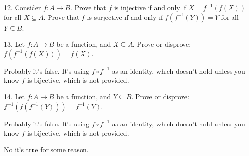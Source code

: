 \documentclass{article}
\begin{document}
\begin{exercise}{}{}
	{12. Consider $f: A \rightarrow B$. Prove that $f$ is injective if and only
		if $X=f^{-1}(f(X))$ for all $X \subseteq A$. Prove that $f$ is surjective if
		and only if $f\left(f^{-1}(Y)\right)=Y$ for all $Y \subseteq B$.}
\end{exercise}{}{}

\begin{exercise}{}{}
	{13. Let $f: A \rightarrow B$ be a function, and $X \subseteq A$. Prove or
		disprove: $f\left(f^{-1}(f(X))\right)=f(X)$.}
	\begin{alist}
		\item Probably it's false. It's using $f\circ f^{-1}$ as an identity, which
		doesn't hold unless you know $f$ is bijective, which is not provided.
	\end{alist}
\end{exercise}{}{}

\begin{exercise}{}{}
	{14. Let $f: A \rightarrow B$ be a function, and $Y \subseteq B$. Prove or
		disprove: $f^{-1}\left(f\left(f^{-1}(Y)\right)\right)=f^{-1}(Y)$.}
	\begin{alist}
		\item Probably it's false. It's using $f\circ f^{-1}$ as an identity, which
		doesn't hold unless you know $f$ is bijective, which is not provided.
		\item No it's true for some reason.
	\end{alist}
\end{exercise}{}{}
\end{document}
